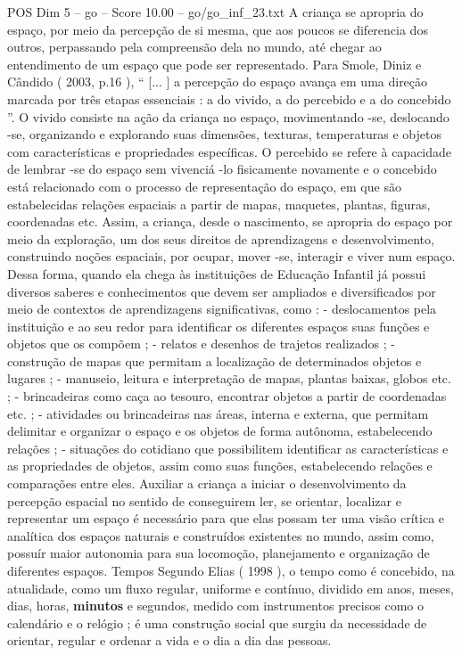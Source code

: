 \begin{textsample}{POS Dim 5 – go – Score 10.00 – go/go\_inf\_23.txt}
A criança se apropria do espaço, por meio da percepção de si mesma, que aos poucos se diferencia dos outros, perpassando pela compreensão dela no mundo, até chegar ao entendimento de um espaço que pode ser representado.
Para Smole, Diniz e Cândido ( 2003, p.16 ), “ [... ] a percepção do espaço avança em uma direção marcada por três etapas essenciais : a do vivido, a do percebido e a do concebido ”.
O vivido consiste na ação da criança no espaço, movimentando -se, deslocando -se, organizando e explorando suas dimensões, texturas, temperaturas e objetos com características e propriedades específicas.
O percebido se refere à capacidade de lembrar -se do espaço sem vivenciá -lo fisicamente novamente e o concebido está relacionado com o processo de representação do espaço, em que são estabelecidas relações espaciais a partir de mapas, maquetes, plantas, figuras, coordenadas etc.
Assim, a criança, desde o nascimento, se apropria do espaço por meio da exploração, um dos seus direitos de aprendizagens e desenvolvimento, construindo noções espaciais, por ocupar, mover -se, interagir e viver num espaço.
Dessa forma, quando ela chega às instituições de Educação Infantil já possui diversos saberes e conhecimentos que devem ser ampliados e diversificados por meio de contextos de aprendizagens significativas, como : - deslocamentos pela instituição e ao seu redor para identificar os diferentes espaços suas funções e objetos que os compõem ; - relatos e desenhos de trajetos realizados ; - construção de mapas que permitam a localização de determinados objetos e lugares ; - manuseio, leitura e interpretação de mapas, plantas baixas, globos etc. ; - brincadeiras como caça ao tesouro, encontrar objetos a partir de coordenadas etc. ; - atividades ou brincadeiras nas áreas, interna e externa, que permitam delimitar e organizar o espaço e os objetos de forma autônoma, estabelecendo relações ; - situações do cotidiano que possibilitem identificar as características e as propriedades de objetos, assim como suas funções, estabelecendo relações e comparações entre eles.
Auxiliar a criança a iniciar o desenvolvimento da percepção espacial no sentido de conseguirem ler, se orientar, localizar e representar um espaço é necessário para que elas possam ter uma visão crítica e analítica dos espaços naturais e construídos existentes no mundo, assim como, possuír maior autonomia para sua locomoção, planejamento e organização de diferentes espaços.
Tempos Segundo Elias ( 1998 ), o tempo como é concebido, na atualidade, como um fluxo regular, uniforme e contínuo, dividido em anos, meses, dias, horas, \textbf{minutos} e segundos, medido com instrumentos precisos como o calendário e o relógio ; é uma construção social que surgiu da necessidade de orientar, regular e ordenar a vida e o dia a dia das pessoas.

\end{textsample}
